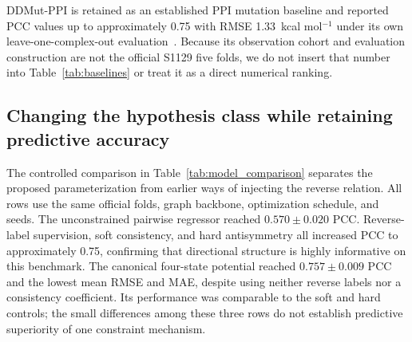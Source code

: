 \documentclass[preprint,12pt]{elsarticle}
\begin{document}
\begin{table}[t]
\centering
\caption{Performance on the official S1129 unseen-complex folds. Baselines are values reported by DSSA-PPI for the same observations, outer folds, and fold-mean metric definition; ours is locally computed. Training pipelines and per-mutation predictions are not matched, so cross-method differences are descriptive rather than paired comparisons.}
\label{tab:baselines}
\end{table}

DDMut-PPI is retained as an established PPI mutation baseline and reported
PCC values up to approximately 0.75 with RMSE 1.33~kcal mol$^{-1}$ under its
own leave-one-complex-out evaluation~\cite{ddmutppi}. Because its observation
cohort and evaluation construction are not the official S1129 five folds, we
do not insert that number into Table~\ref{tab:baselines} or treat it as a
direct numerical ranking.

\subsection{Changing the hypothesis class while retaining predictive accuracy}
\label{sec:predictive_value}

The controlled comparison in Table~\ref{tab:model_comparison} separates the proposed parameterization from earlier ways of injecting the reverse relation. All rows use the same official folds, graph backbone, optimization schedule, and seeds. The unconstrained pairwise regressor reached $0.570\pm0.020$ PCC. Reverse-label supervision, soft consistency, and hard antisymmetry all increased PCC to approximately 0.75, confirming that directional structure is highly informative on this benchmark. The canonical four-state potential reached $0.757\pm0.009$ PCC and the lowest mean RMSE and MAE, despite using neither reverse labels nor a consistency coefficient. Its performance was comparable to the soft and hard controls; the small differences among these three rows do not establish predictive superiority of one constraint mechanism.
\end{document}
